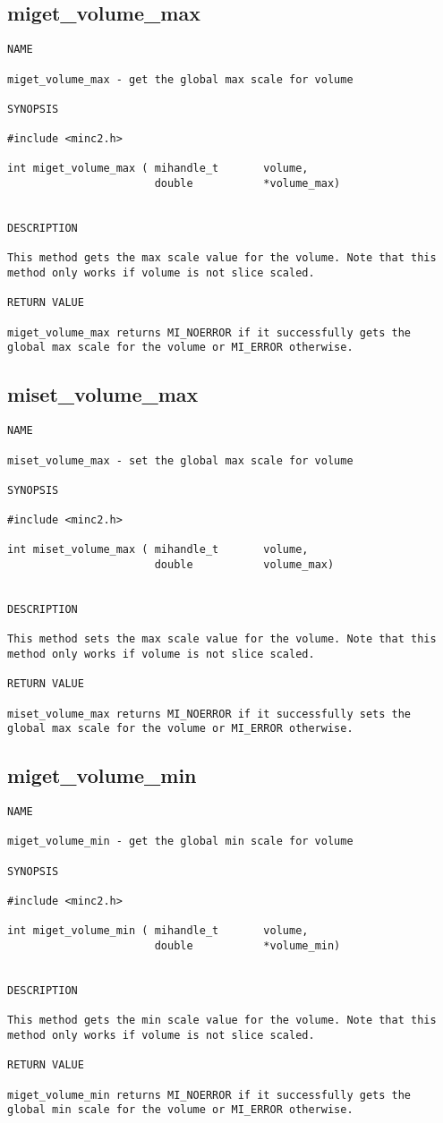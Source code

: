 \documentclass{article}
\begin{document}
\subsection{miget\_volume\_max}
\begin{verbatim}
NAME

miget_volume_max - get the global max scale for volume

SYNOPSIS

#include <minc2.h>

int miget_volume_max ( mihandle_t       volume,
                       double           *volume_max)


DESCRIPTION

This method gets the max scale value for the volume. Note that this 
method only works if volume is not slice scaled.

RETURN VALUE

miget_volume_max returns MI_NOERROR if it successfully gets the
global max scale for the volume or MI_ERROR otherwise. 
\end{verbatim}

\subsection{miset\_volume\_max}
\begin{verbatim}
NAME

miset_volume_max - set the global max scale for volume

SYNOPSIS

#include <minc2.h>

int miset_volume_max ( mihandle_t       volume,
                       double           volume_max)


DESCRIPTION

This method sets the max scale value for the volume. Note that this 
method only works if volume is not slice scaled.

RETURN VALUE

miset_volume_max returns MI_NOERROR if it successfully sets the
global max scale for the volume or MI_ERROR otherwise. 
\end{verbatim}

\subsection{miget\_volume\_min}
\begin{verbatim}
NAME

miget_volume_min - get the global min scale for volume

SYNOPSIS

#include <minc2.h>

int miget_volume_min ( mihandle_t       volume,
                       double           *volume_min)


DESCRIPTION

This method gets the min scale value for the volume. Note that this 
method only works if volume is not slice scaled.

RETURN VALUE

miget_volume_min returns MI_NOERROR if it successfully gets the
global min scale for the volume or MI_ERROR otherwise. 
\end{verbatim}
\end{document}
